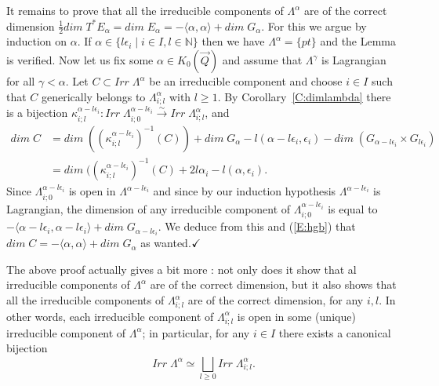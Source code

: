 \documentclass[a4paper,10pt]{amsart}
\def\qed{$\hfill \checkmark$}
\def\N{\mathbb{N}}
\def\a{\alpha}
\numberwithin{equation}{section}
\begin{document}
It remains to prove that all the irreducible components of $\Lambda^{\a}$ are of the correct dimension $\frac{1}{2} dim\;T^*E_{\a}=dim\;E_{\a}=-\langle \a,\a \rangle + dim\;G_{\a}$. For this we argue by induction on $\a$. If $\a \in \{l\epsilon_i\;|\; i \in I, l \in \N\}$ then we have $\Lambda^{\a}=\{pt\}$ and the Lemma is verified. Now let us fix some $\a \in K_0(\vec{Q})$ and assume that $\Lambda^{\gamma}$ is Lagrangian for all $\gamma < \alpha$. Let $C \subset Irr\;\Lambda^{\a}$ be an irreducible component and choose $i \in I$ such that $C$ generically belongs to $\Lambda^{\a}_{i;l}$ with $l \geq 1$. By Corollary~\ref{C:dimlambda} there is a bijection $\kappa^{\a-l\epsilon_i}_{i;l} : Irr\;\Lambda^{\a-l\epsilon_i}_{i;0} \stackrel{\sim}{\to} Irr\;\Lambda^{\a}_{i;l}$, and 
\begin{equation}\label{E:hgb}
\begin{split}
dim\;C&=dim\;((\kappa^{\a-l\epsilon_i}_{i;l})^{-1}(C)) + dim\;G_{\a} -l(\a-l\epsilon_i,\epsilon_i)-dim\;(G_{\a-l\epsilon_i} \times G_{l\epsilon_i}) \\
&=dim\;((\kappa^{\a-l\epsilon_i}_{i;l})^{-1}(C)+2l\a_i -l(\a,\epsilon_i).
\end{split}
\end{equation}
Since $\Lambda^{\a-l\epsilon_i}_{i;0}$ is open in $\Lambda^{\a-l\epsilon_i}$ and since by our induction hypothesis $\Lambda^{\a-l\epsilon_i}$ is Lagrangian, the dimension of any irreducible component of $\Lambda^{\a-l\epsilon_i}_{i;0}$ is equal to $-\langle \a-l\epsilon_i, \a-l\epsilon_i\rangle + dim\;G_{\a-l\epsilon_i}$. We deduce from this and (\ref{E:hgb}) that $dim\;C=-\langle \a, \a \rangle + dim\;G_{\a}$ as wanted.\qed

\vspace{.2in}

The above proof actually gives a bit more : not only does it show that al irreducible components of $\Lambda^{\a}$ are of the correct dimension, but it also shows that all the irreducible components of $\Lambda^{\a}_{i;l}$ are of the correct dimension, for any $i, l$. In other words, each irreducible component of $\Lambda^{\a}_{i;l}$ is open in some (unique) irreducible component of $\Lambda^{\a}$; in particular, for any $i \in I$ there exists a canonical bijection
\begin{equation}\label{E:bijlambda}
Irr\;\Lambda^{\a} \simeq \bigsqcup_{l \geq 0} Irr\;\Lambda^{\a}_{i;l}.
\end{equation}

\vspace{.3in}
\end{document}
